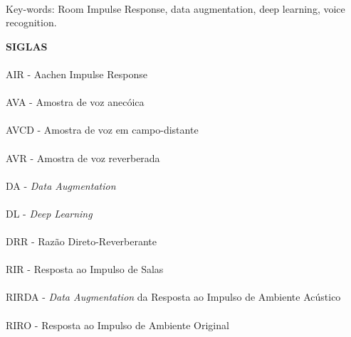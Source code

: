 \paragraph{}
\noindent Key-words: Room Impulse Response, data augmentation, deep learning, voice recognition.

\pagebreak


\begin{center}
\textbf{SIGLAS}
\end{center}
      \vspace{0.5cm}

\paragraph{}AIR - Aachen Impulse Response
\paragraph{}AVA - Amostra de voz anecóica
\paragraph{}AVCD - Amostra de voz em campo-distante
\paragraph{}AVR - Amostra de voz reverberada
\paragraph{}DA - \textit{Data Augmentation}
\paragraph{}DL - \textit{Deep Learning}
\paragraph{}DRR - Razão Direto-Reverberante
\paragraph{}RIR - Resposta ao Impulso de Salas
\paragraph{}RIRDA - \textit{Data Augmentation} da Resposta ao Impulso de Ambiente Acústico 
\paragraph{}RIRO - Resposta ao Impulso de Ambiente Original
